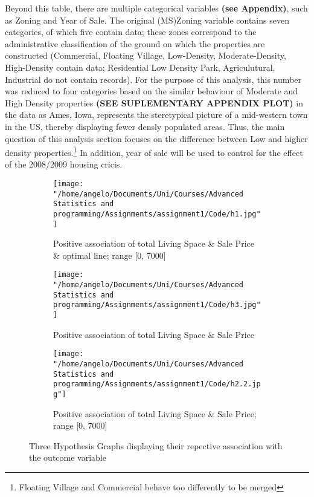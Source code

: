 \documentclass[a4paper]{article}
\begin{document}
Beyond this table, there are multiple categorical variables \textbf{(see Appendix)}, such as Zoning and Year of Sale. The original (MS)Zoning variable contains seven categories, of which five contain data; these zones correspond to the administrative classification of the ground on which the properties are constructed (Commercial, Floating Village, Low-Density, Moderate-Density, High-Density contain data; Residential Low Density Park, Agriculutural, Industrial do not contain records). For the purpose of this analysis, this number was reduced to four categories based on the similar behaviour of Moderate and High Density properties \textbf{(SEE SUPLEMENTARY APPENDIX PLOT)} in  the data as Ames, Iowa, represents the steretypical picture of a mid-western town in the US, thereby displaying fewer densly populated areas. Thus, the main question of this analysis section focuses on the difference between Low and higher density properties.\footnote{Floating Village and Commercial behave too differently to be merged} In addition, year of sale will be used to control for the effect of the 2008/2009 housing cricis. 






\begin{figure}
     \centering
     \begin{subfigure}[b]{0.45\textwidth}
         \centering
         \texttt{[image: "/home/angelo/Documents/Uni/Courses/Advanced Statistics and programming/Assignments/assignment1/Code/h1.jpg"]}
         \small
         \caption{Positive association of total Living Space \& Sale Price \& optimal line; range [0, 7000]}
         \label{fig:y equals x}
     \end{subfigure}
     \hfill
     \begin{subfigure}[b]{0.45\textwidth}
         \centering
         \texttt{[image: "/home/angelo/Documents/Uni/Courses/Advanced Statistics and programming/Assignments/assignment1/Code/h3.jpg"]}
         \small
         \caption{Positive association of total Living Space \& Sale Price }
         \label{fig:three sin x}
     \end{subfigure}
     \hfill
     \begin{subfigure}[b]{0.45\textwidth}
         \centering
         \texttt{[image: "/home/angelo/Documents/Uni/Courses/Advanced Statistics and programming/Assignments/assignment1/Code/h2.2.jpg"]}
         \small
         \caption{Positive association of total Living Space \& Sale Price; range [0, 7000]}
         \label{fig:five over x}
     \end{subfigure}
     	\small
        \caption{Three Hypothesis Graphs displaying their repective association with the outcome variable}
        \label{fig:three graphs}
\end{figure}
\end{document}
